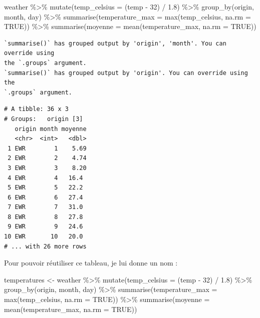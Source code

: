 \documentclass[
  a4paper,
  DIV=11,
  numbers=noendperiod,
  oneside]{scrreprt}
\newenvironment{Shaded}{}{}
\newcommand{\AttributeTok}[1]{\textcolor[rgb]{0.84,0.23,0.29}{#1}}
\newcommand{\ConstantTok}[1]{\textcolor[rgb]{0.00,0.36,0.77}{#1}}
\newcommand{\DecValTok}[1]{\textcolor[rgb]{0.00,0.36,0.77}{#1}}
\newcommand{\FloatTok}[1]{\textcolor[rgb]{0.00,0.36,0.77}{#1}}
\newcommand{\FunctionTok}[1]{\textcolor[rgb]{0.44,0.26,0.76}{#1}}
\newcommand{\NormalTok}[1]{\textcolor[rgb]{0.14,0.16,0.18}{#1}}
\newcommand{\OtherTok}[1]{\textcolor[rgb]{0.44,0.26,0.76}{#1}}
\newcommand{\SpecialCharTok}[1]{\textcolor[rgb]{0.00,0.36,0.77}{#1}}
\begin{document}
\begin{Shaded}
\begin{Highlighting}[]
\NormalTok{weather }\SpecialCharTok{\%\textgreater{}\%} 
  \FunctionTok{mutate}\NormalTok{(}\AttributeTok{temp\_celsius =}\NormalTok{ (temp }\SpecialCharTok{{-}} \DecValTok{32}\NormalTok{) }\SpecialCharTok{/} \FloatTok{1.8}\NormalTok{) }\SpecialCharTok{\%\textgreater{}\%} 
  \FunctionTok{group\_by}\NormalTok{(origin, month, day) }\SpecialCharTok{\%\textgreater{}\%} 
  \FunctionTok{summarise}\NormalTok{(}\AttributeTok{temperature\_max =} \FunctionTok{max}\NormalTok{(temp\_celsius, }\AttributeTok{na.rm =} \ConstantTok{TRUE}\NormalTok{)) }\SpecialCharTok{\%\textgreater{}\%} 
  \FunctionTok{summarise}\NormalTok{(}\AttributeTok{moyenne =} \FunctionTok{mean}\NormalTok{(temperature\_max, }\AttributeTok{na.rm =} \ConstantTok{TRUE}\NormalTok{))}
\end{Highlighting}
\end{Shaded}

\begin{verbatim}
`summarise()` has grouped output by 'origin', 'month'. You can override using
the `.groups` argument.
`summarise()` has grouped output by 'origin'. You can override using the
`.groups` argument.
\end{verbatim}

\begin{verbatim}
# A tibble: 36 x 3
# Groups:   origin [3]
   origin month moyenne
   <chr>  <int>   <dbl>
 1 EWR        1    5.69
 2 EWR        2    4.74
 3 EWR        3    8.20
 4 EWR        4   16.4 
 5 EWR        5   22.2 
 6 EWR        6   27.4 
 7 EWR        7   31.0 
 8 EWR        8   27.8 
 9 EWR        9   24.6 
10 EWR       10   20.0 
# ... with 26 more rows
\end{verbatim}

Pour pouvoir réutiliser ce tableau, je lui donne un nom :

\begin{Shaded}
\begin{Highlighting}[]
\NormalTok{temperatures }\OtherTok{\textless{}{-}}\NormalTok{ weather }\SpecialCharTok{\%\textgreater{}\%} 
  \FunctionTok{mutate}\NormalTok{(}\AttributeTok{temp\_celsius =}\NormalTok{ (temp }\SpecialCharTok{{-}} \DecValTok{32}\NormalTok{) }\SpecialCharTok{/} \FloatTok{1.8}\NormalTok{) }\SpecialCharTok{\%\textgreater{}\%} 
  \FunctionTok{group\_by}\NormalTok{(origin, month, day) }\SpecialCharTok{\%\textgreater{}\%} 
  \FunctionTok{summarise}\NormalTok{(}\AttributeTok{temperature\_max =} \FunctionTok{max}\NormalTok{(temp\_celsius, }\AttributeTok{na.rm =} \ConstantTok{TRUE}\NormalTok{)) }\SpecialCharTok{\%\textgreater{}\%} 
  \FunctionTok{summarise}\NormalTok{(}\AttributeTok{moyenne =} \FunctionTok{mean}\NormalTok{(temperature\_max, }\AttributeTok{na.rm =} \ConstantTok{TRUE}\NormalTok{))}
\end{Highlighting}
\end{Shaded}
\end{document}
